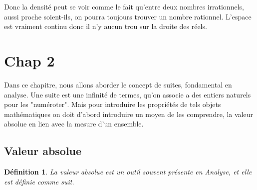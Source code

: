 \documentclass[a4paper, 12pt, french, twoside]{article}
\newtheorem{theorem}{Théorème}[section]
\newtheorem{defi}[theorem]{Définition}
\newcommand{\Nn}{{\mathbb{N}}}
\newcommand{\Zz}{{\mathbb{Z}}}
\newcommand{\Rr}{{\mathbb{R}}}
\newcommand{\Qq}{{\mathbb{Q}}}
\begin{document}
    


Donc la densité peut se voir comme le fait qu'entre deux nombres irrationnels, aussi proche soient-ils, on pourra toujours trouver un nombre rationnel. L'espace est vraiment continu donc il n'y aucun trou sur la droite des réels. 



\section{Chap 2}
Dans ce chapitre, nous allons aborder le concept de suites, fondamental en analyse. Une suite est une infinité de termes, qu'on associe a des entiers naturels pour les "numéroter". Mais pour introduire les propriétés de tels objets mathématiques on doit d'abord introduire un moyen de les comprendre, la valeur absolue en lien avec la mesure d'un ensemble.
\subsection{Valeur absolue }
\begin{defi}
    La valeur absolue est un outil souvent présente en Analyse, et elle est définie comme suit.
\end{defi} 
\end{document}
